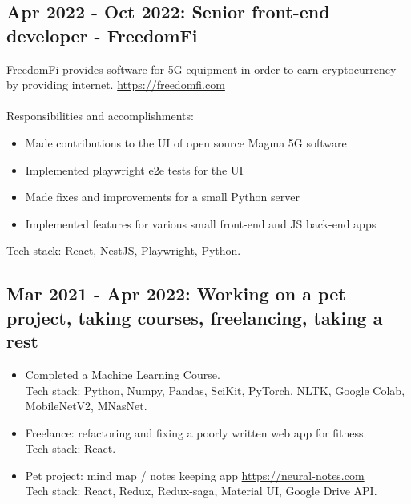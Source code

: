 \documentclass[a4paper, 14pt]{article}
\begin{document}
  \subsection{Apr 2022 - Oct 2022: Senior front-end developer - FreedomFi}

  FreedomFi provides software for 5G equipment in order to earn cryptocurrency by providing internet. \url{https://freedomfi.com} \\
  \\
  Responsibilities and accomplishments:
    \begin{itemize}
      \item Made contributions to the UI of open source Magma 5G software \\
      \item Implemented playwright e2e tests for the UI \\
      \item Made fixes and improvements for a small Python server \\
      \item Implemented features for various small front-end and JS back-end apps
    \end{itemize}
  \bigskip
  Tech stack: React, NestJS, Playwright, Python.

  \subsection{Mar 2021 - Apr 2022: Working on a pet project, taking courses, freelancing, taking a rest}

    \begin{itemize}
      \item Completed a Machine Learning Course. \\
      Tech stack: Python, Numpy, Pandas, SciKit, PyTorch, NLTK, Google Colab, MobileNetV2, MNasNet. \\
      \item Freelance: refactoring and fixing a poorly written web app for fitness. \\
      Tech stack: React. \\
      \item Pet project: mind map / notes keeping app \url{https://neural-notes.com} \\
      Tech stack: React, Redux, Redux-saga, Material UI, Google Drive API.
    \end{itemize}
  \bigskip
\end{document}
